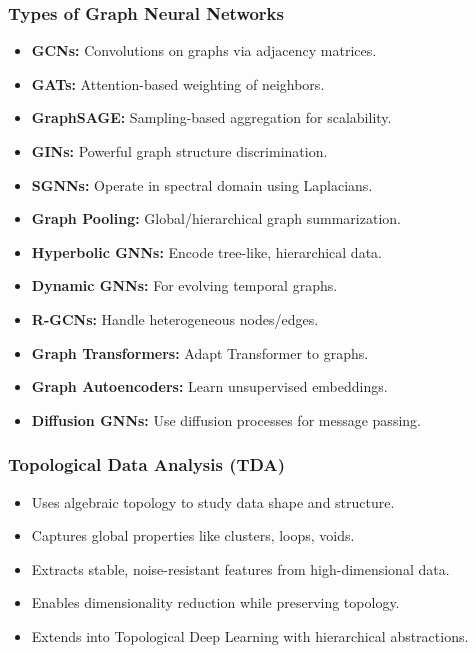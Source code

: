 \begin{frame}[fragile]\frametitle{Types of Graph Neural Networks}
  \begin{itemize}
    \item \textbf{GCNs:} Convolutions on graphs via adjacency matrices.
    \item \textbf{GATs:} Attention-based weighting of neighbors.
    \item \textbf{GraphSAGE:} Sampling-based aggregation for scalability.
    \item \textbf{GINs:} Powerful graph structure discrimination.
    \item \textbf{SGNNs:} Operate in spectral domain using Laplacians.
    \item \textbf{Graph Pooling:} Global/hierarchical graph summarization.
    \item \textbf{Hyperbolic GNNs:} Encode tree-like, hierarchical data.
    \item \textbf{Dynamic GNNs:} For evolving temporal graphs.
    \item \textbf{R-GCNs:} Handle heterogeneous nodes/edges.
    \item \textbf{Graph Transformers:} Adapt Transformer to graphs.
    \item \textbf{Graph Autoencoders:} Learn unsupervised embeddings.
    \item \textbf{Diffusion GNNs:} Use diffusion processes for message passing.
  \end{itemize}
\end{frame}

\begin{frame}[fragile]\frametitle{Topological Data Analysis (TDA)}
  \begin{itemize}
    \item Uses algebraic topology to study data shape and structure.
    \item Captures global properties like clusters, loops, voids.
    \item Extracts stable, noise-resistant features from high-dimensional data.
    \item Enables dimensionality reduction while preserving topology.
    \item Extends into Topological Deep Learning with hierarchical abstractions.
  \end{itemize}
\end{frame}

